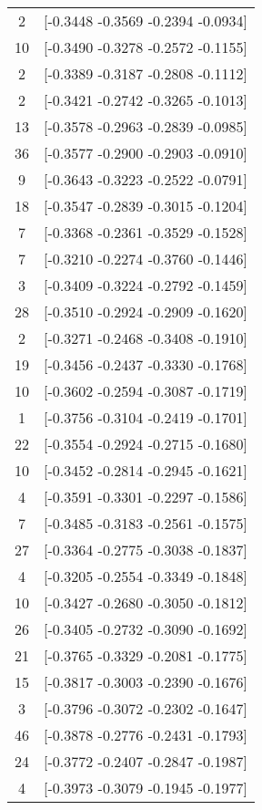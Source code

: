 \documentclass[12pt, fullpage,letterpaper]{article}
\begin{document}
\begin{enumerate}
\begin{enumerate}
{\begin{longtable}{|c|c|}
			  2 &  [-0.3448 -0.3569 -0.2394 -0.0934] \\
			 10 &  [-0.3490 -0.3278 -0.2572 -0.1155] \\
			  2 &  [-0.3389 -0.3187 -0.2808 -0.1112] \\
			  2 &  [-0.3421 -0.2742 -0.3265 -0.1013] \\
			 13 &  [-0.3578 -0.2963 -0.2839 -0.0985] \\
			 36 &  [-0.3577 -0.2900 -0.2903 -0.0910] \\
			  9 &  [-0.3643 -0.3223 -0.2522 -0.0791] \\
			 18 &  [-0.3547 -0.2839 -0.3015 -0.1204] \\
			  7 &  [-0.3368 -0.2361 -0.3529 -0.1528] \\
			  7 &  [-0.3210 -0.2274 -0.3760 -0.1446] \\
			  3 &  [-0.3409 -0.3224 -0.2792 -0.1459] \\
			 28 &  [-0.3510 -0.2924 -0.2909 -0.1620] \\
			  2 &  [-0.3271 -0.2468 -0.3408 -0.1910] \\
			 19 &  [-0.3456 -0.2437 -0.3330 -0.1768] \\
			 10 &  [-0.3602 -0.2594 -0.3087 -0.1719] \\
			  1 &  [-0.3756 -0.3104 -0.2419 -0.1701] \\
			 22 &  [-0.3554 -0.2924 -0.2715 -0.1680] \\
			 10 &  [-0.3452 -0.2814 -0.2945 -0.1621] \\
			  4 &  [-0.3591 -0.3301 -0.2297 -0.1586] \\
			  7 &  [-0.3485 -0.3183 -0.2561 -0.1575] \\
			 27 &  [-0.3364 -0.2775 -0.3038 -0.1837] \\
			  4 &  [-0.3205 -0.2554 -0.3349 -0.1848] \\
			 10 &  [-0.3427 -0.2680 -0.3050 -0.1812] \\
			 26 &  [-0.3405 -0.2732 -0.3090 -0.1692] \\
			 21 &  [-0.3765 -0.3329 -0.2081 -0.1775] \\
			 15 &  [-0.3817 -0.3003 -0.2390 -0.1676] \\
			  3 &  [-0.3796 -0.3072 -0.2302 -0.1647] \\
			 46 &  [-0.3878 -0.2776 -0.2431 -0.1793] \\
			 24 &  [-0.3772 -0.2407 -0.2847 -0.1987] \\
			  4 &  [-0.3973 -0.3079 -0.1945 -0.1977] \\

\end{longtable}}
\end{enumerate}
\end{enumerate}
\end{document}
